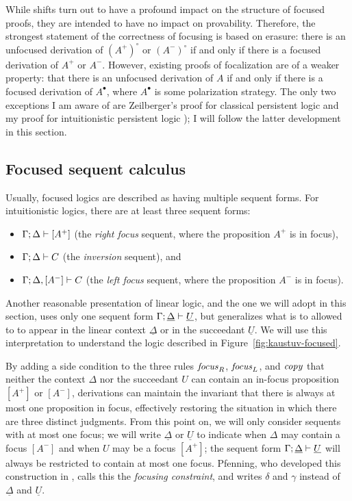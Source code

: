 While shifts turn out to have a profound impact on the structure of
focused proofs, they are intended to have no impact on
provability. Therefore, the strongest statement of the correctness of
focusing is based on erasure: there is an unfocused derivation of
$(A^+)^\circ$ or $(A^-)^\circ$ if and only if there is a focused
derivation of $A^+$ or $A^-$.  However, existing proofs of
focalization are of a weaker property: that there is an unfocused
derivation of $A$ if and only if there is a focused derivation of
$A^\bullet$, where $A^\bullet$ is some polarization strategy.  The
only two exceptions I am aware of are Zeilberger's proof for classical
persistent logic \cite{zeilberger08unity} and my proof for
intuitionistic persistent logic \cite{simmons11structural}); I will
follow the latter development in this section.

\subsection{Focused sequent calculus}

Usually, focused logics are described as having multiple
sequent forms. For intuitionistic logics, there are at least three
sequent forms:
\begin{itemize}
\item ${\Gamma};{\Delta} \vdash [{A^+}] \mathstrut$ (the {\it right focus} sequent, where
the proposition $A^+$ is in focus),
\item ${\Gamma};{\Delta} \vdash {C} \mathstrut$ (the {\it inversion} sequent), and
\item ${\Gamma};{\Delta}, [{A^-}] \vdash {C} \mathstrut$ (the {\it left focus} sequent,
where the proposition $A^-$ is in focus).
\end{itemize}
Another reasonable presentation of linear logic, and the one we will
adopt in this section, uses only one sequent form
${\Gamma};{\underline{\Delta}} \vdash {\underline{U}} \mathstrut$, 
but generalizes what is to allowed to
to appear in the linear context $\underline{\Delta}$ or in the succeedant 
$\underline{U}$. We
will use this interpretation to understand the logic described in
Figure~\ref{fig:kaustuv-focused}.



By adding a side condition to the three rules ${\it focus}_R$, ${\it
  focus}_L$, and ${\it copy}$ that neither the context $\Delta$ nor
the succeedant $U$ can contain an in-focus proposition $[A^+]$ or
$[A^-]$, derivations can maintain the invariant that there is always
at most one proposition in focus, effectively restoring the situation
in which there are three distinct judgments. From this point on, we
will only consider sequents with at most one focus; we will write
$\underline{\Delta}$ or $\underline{U}$ to indicate when $\Delta$ may
contain a focus $[A^-]$ and when $U$ may be a focus $[A^+]$;
the sequent form ${\Gamma};{\underline{\Delta}} \vdash {\underline{U}} \mathstrut$
will always be restricted to contain at most one focus.  Pfenning, who
developed this construction in \cite{pfenning12chaining}, calls this
the {\it focusing constraint}, and writes $\delta$ and $\gamma$
instead of $\underline{\Delta}$ and $\underline{U}$.

